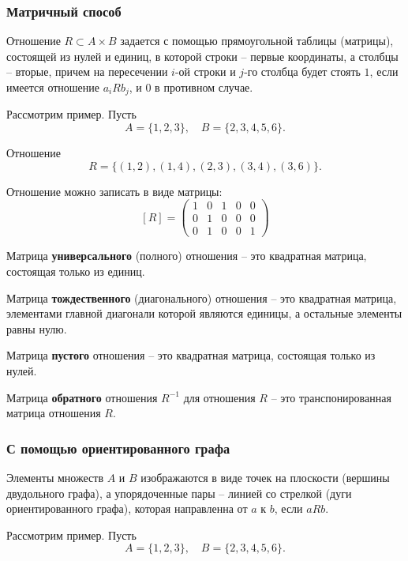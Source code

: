 \documentclass[a5paper, 11pt]{extarticle}
\theoremstyle{definition}
\theoremstyle{definition}
\theoremstyle{definition}
\numberwithin{figure}{section}
\numberwithin{table}{section}
\begin{document}
\subsubsection{Матричный способ}

Отношение \(R \subset A \times B\) задается с помощью прямоугольной таблицы (матрицы), состоящей из нулей и единиц, в которой строки -- первые координаты, а столбцы -- вторые, причем на пересечении \(i\)-ой строки и \(j\)-го столбца будет стоять \(1\), если имеется отношение \(a_i R b_j\), и \(0\) в противном случае.

Рассмотрим пример. Пусть
\[
    A = \{1, 2, 3\},
    \quad
    B = \{2, 3, 4, 5, 6\}.
\]

Отношение
\[
    R = \{(1, 2), (1, 4), (2, 3), (3, 4), (3, 6)\}.
\]

Отношение можно записать в виде матрицы:
\[
    [R] =
    \begin{pmatrix}
        1 & 0 & 1 & 0 & 0 \\
        0 & 1 & 0 & 0 & 0 \\
        0 & 1 & 0 & 0 & 1
    \end{pmatrix}
\]

Матрица \textbf{универсального} (полного) отношения -- это квадратная матрица, состоящая только из единиц.

Матрица \textbf{тождественного} (диагонального) отношения -- это квадратная матрица, элементами главной диагонали которой являются единицы, а остальные элементы равны нулю.

Матрица \textbf{пустого} отношения -- это квадратная матрица, состоящая только из нулей.

Матрица \textbf{обратного} отношения \(R^{-1}\) для отношения \(R\) -- это транспонированная матрица отношения \(R\).

\subsubsection{С помощью ориентированного графа}

Элементы множеств \(A\) и \(B\) изображаются в виде точек на плоскости (вершины двудольного графа), а упорядоченные пары --  линией со стрелкой (дуги ориентированного графа), которая направленна от \(a\) к \(b\), если \(aRb\).

Рассмотрим пример. Пусть
\[
    A = \{1, 2, 3\},
    \quad
    B = \{2, 3, 4, 5, 6\}.
\]
\end{document}
